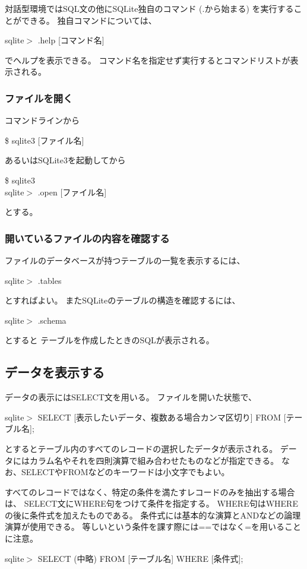 \documentclass [11pt,a4paper,dvipdfmx] {jarticle}
\begin{document}
対話型環境ではSQL文の他にSQLite独自のコマンド (.から始まる)
を実行することができる。
独自コマンドについては、
\begin{screen}[4]
    sqlite$>$ .help [コマンド名]
\end{screen}
でヘルプを表示できる。
コマンド名を指定せず実行するとコマンドリストが表示される。

\subsubsection{ファイルを開く}
コマンドラインから
\begin{screen}[4]
    \$ sqlite3 [ファイル名]
\end{screen}



あるいはSQLite3を起動してから
\begin{screen}[4]
    \$ sqlite3　\\
    sqlite$>$ .open [ファイル名]
\end{screen}
とする。

\subsubsection{開いているファイルの内容を確認する}
ファイルのデータベースが持つテーブルの一覧を表示するには、
\begin{screen}[4]
    sqlite$>$ .tables
\end{screen}
とすればよい。
またSQLiteのテーブルの構造を確認するには、
\begin{screen}[4]
    sqlite$>$ .schema
\end{screen}
とすると
テーブルを作成したときのSQLが表示される。


\subsection{データを表示する}
データの表示にはSELECT文を用いる。
ファイルを開いた状態で、
\begin{screen}[4]
    sqlite$>$ SELECT [表示したいデータ、複数ある場合カンマ区切り] FROM [テーブル名];
\end{screen}
とするとテーブル内のすべてのレコードの選択したデータが表示される。
データにはカラム名やそれを四則演算で組み合わせたものなどが指定できる。
なお、SELECTやFROMなどのキーワードは小文字でもよい。

すべてのレコードではなく、特定の条件を満たすレコードのみを抽出する場合は、
SELECT文にWHERE句をつけて条件を指定する。
WHERE句はWHEREの後に条件式を加えたものである。
条件式には基本的な演算とANDなどの論理演算が使用できる。
等しいという条件を課す際には==ではなく=を用いることに注意。
\begin{screen}[4]
    sqlite$>$ SELECT (中略) FROM [テーブル名] WHERE [条件式];
\end{screen}
\end{document}
